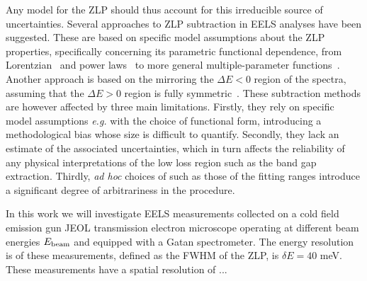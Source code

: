 Any model for the ZLP should thus account for this irreducible source of uncertainties.
%
Several approaches to ZLP subtraction in EELS analyses have been suggested.
%
These are based on specific model assumptions about the ZLP properties, specifically
concerning its parametric functional dependence, from Lorentzian~\cite{Dorneich:1998}
and power laws~\cite{Erni:2005} to more general multiple-parameter functions~\cite{Benthem:2001}.
%
Another approach is based on the mirroring the $\Delta E <0$ region of the spectra, assuming
that the $\Delta E>0$ region is fully symmetric~\cite{Lazar:2003}.
%
These  subtraction methods are however affected by three main limitations.
%
Firstly, they rely on specific model assumptions {\it e.g.} with
the choice of functional form, introducing a methodological
bias whose size is difficult to quantify.
%
Secondly, they lack an estimate of the associated uncertainties, which in turn affects
the reliability of any physical interpretations of the low loss region such as the band gap extraction.
%
Thirdly, {\it ad hoc} choices of such as those of the fitting ranges introduce a significant degree of
arbitrariness in the procedure.
      
In this work we will investigate EELS measurements collected  on a cold field emission gun JEOL
transmission electron microscope operating at different beam energies $E_{\rm beam}$
and equipped with a  Gatan spectrometer.
%
The energy resolution is of these measurements,
defined as the FWHM of the ZLP, is $\delta E=40$ meV.
%
These measurements have a spatial resolution of ...

